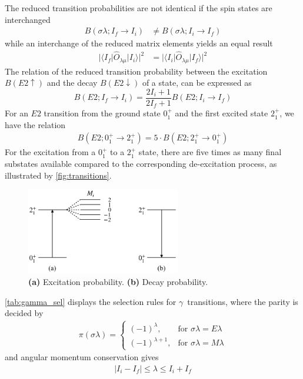 \documentclass[twoside,english]{uiofysmaster/uiofysmaster}
\newcommand{\ga}{$\gamma$}
\let\orgautoref\autoref
\renewcommand{\autoref}
        {%
		 \def\sectionautorefname{Section}%
		 \def\subsectionautorefname{Section}%
		 \def\subsubsectionautorefname{Section}%
		 \def\chapterautorefname{Chapter}%
          \orgautoref}
\begin{document}
The reduced transition probabilities are not identical if the spin states are interchanged
\begin{align}
	B(\sigma \lambda; I_f \rightarrow I_i) &\neq B(\sigma \lambda; I_i \rightarrow I_f)
\end{align}
while an interchange of the reduced matrix elements yields an equal result
\begin{align}
	| \langle I_f | \hat{O}_{\lambda \mu} | I_i \rangle |^2 &= | \langle I_i | \hat{O}_{\lambda \mu} | I_f \rangle |^2
\end{align}
The relation of the reduced transition probability between the excitation $B(E2 \uparrow)$ and the decay $B(E2 \downarrow)$ of a state, can be expressed as
\begin{equation}
	B(E2; I_f \rightarrow I_i) = \frac{2I_i + 1}{2I_f + 1} B(E2; I_i \rightarrow I_f)
\end{equation}
For an $E2$ transition from the ground state $0_1^+$ and the first excited state $2_1^+$, we have the relation
\begin{align}
	B(E2; 0_1^+ \rightarrow 2_1^+) = 5 \cdot B(E2; 2_1^+ \rightarrow 0_1^+)
\end{align} 
For the excitation from a $0_1^+$ to a $2_1^+$ state, there are five times as many final substates available compared to the corresponding de-excitation process, as illustrated by \autoref{fig:transitions}.  

\begin{figure}[htb!]
	\centering
	\includegraphics[width=0.6\textwidth]{Images/transitions.png}
	\caption{\textbf{(a)} Excitation probability. \textbf{(b)} Decay probability.}
	\label{fig:transitions}
\end{figure}


\autoref{tab:gamma_sel} displays the selection rules for \ga\ transitions, where the parity \cite{Krane} is decided by
\begin{align}
	\pi (\sigma \lambda) =
    \begin{cases}
    		(-1)^\lambda, & \text{for } \sigma \lambda = E\lambda \\
    		(-1)^{\lambda + 1}, & \text{for } \sigma \lambda = M\lambda
    \end{cases}
\end{align}
and angular momentum conservation gives
\begin{align}
 	| I_i - I_f | \leq \lambda \leq I_i + I_f 
\end{align}
\end{document}
